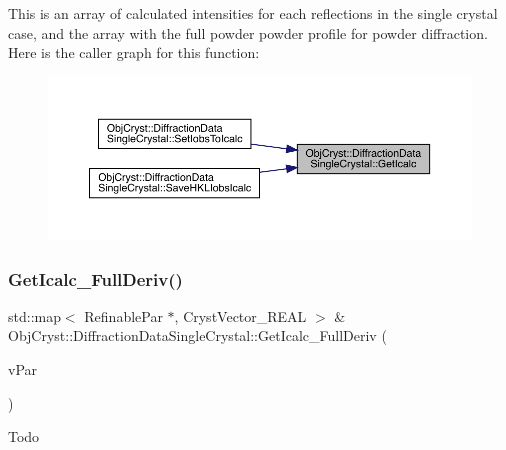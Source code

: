 This is an array of calculated intensities for each reflections in the single crystal case, and the array with the full powder powder profile for powder diffraction. Here is the caller graph for this function\+:
\nopagebreak
\begin{figure}[H]
\begin{center}
\leavevmode
\includegraphics[width=350pt]{class_obj_cryst_1_1_diffraction_data_single_crystal_ae6bc594be6f3e198572516bbe739d851_icgraph}
\end{center}
\end{figure}
\mbox{\label{class_obj_cryst_1_1_diffraction_data_single_crystal_a4de874f4ad2ab26bec50a30eef048f01}} 
\subsubsection{\texorpdfstring{GetIcalc\_FullDeriv()}{GetIcalc\_FullDeriv()}}
{\footnotesize\ttfamily std\+::map$<$ Refinable\+Par $\ast$, Cryst\+Vector\+\_\+\+R\+E\+AL $>$ \& Obj\+Cryst\+::\+Diffraction\+Data\+Single\+Crystal\+::\+Get\+Icalc\+\_\+\+Full\+Deriv (\begin{DoxyParamCaption}\item[{std\+::set$<$ Refinable\+Par $\ast$ $>$ \&}]{v\+Par }\end{DoxyParamCaption})}

\begin{DoxyRefDesc}{Todo}
\item[\mbox{\hyperlink{todo__todo000003}{Todo}}]\end{DoxyRefDesc}
\mbox{\label{class_obj_cryst_1_1_diffraction_data_single_crystal_add61e41d60f231d38bcdf9244339ab78}} 
